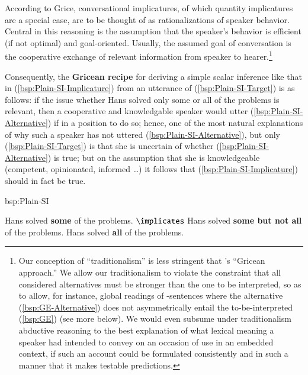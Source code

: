 \documentclass[fleqn,reqno,10pt]{article}
\renewcommand{\es}{\acro{es}}
\renewcommand{\mymark}[1]{\textbf{#1}}
\begin{document}
According to Grice, conversational implicatures, of which quantity
implicatures are a special case, are to be thought of as
rationalizations of speaker behavior. Central in this reasoning is the
assumption that the speaker's behavior is efficient (if not optimal)
and goal-oriented. Usually, the assumed goal of conversation is the
cooperative exchange of relevant information from speaker to
hearer.\footnote{Our conception of ``traditionalism'' is less
  stringent that \citeauthor{ChemlaSingh2014:Remarks-on-the-}'s
  ``Gricean approach.'' We allow our traditionalism to violate the
  constraint that all considered alternatives must be stronger than
  the one to be interpreted, so as to allow, for instance, global
  readings of \es-sentences where the alternative
  (\ref{bsp:GE-Alternative}) does not asymmetrically entail the
  to-be-interpreted (\ref{bsp:GE}) (see more below). We would even
  subsume under traditionalism abductive reasoning to the best
  explanation of what lexical meaning a speaker had intended to convey
  on an occasion of use in an embedded context, if such an account
  could be formulated consistently and in such a manner that it makes
  testable predictions.}

Consequently, the \mymark{Gricean recipe}
\citep[see][]{Geurts2010:Quantity-Implic} for deriving a simple scalar
inference like that in (\ref{bsp:Plain-SI-Implicature}) from an
utterance of (\ref{bsp:Plain-SI-Target}) is as follows: if the issue
whether Hans solved only some or all of the problems is relevant, then
a cooperative and knowledgable speaker would utter
(\ref{bsp:Plain-SI-Alternative}) if in a position to do so; hence, one
of the most natural explanations of why such a speaker has not uttered
(\ref{bsp:Plain-SI-Alternative}), but only (\ref{bsp:Plain-SI-Target})
is that she is uncertain of whether (\ref{bsp:Plain-SI-Alternative})
is true; but on the assumption that she is knowledgeable (competent,
opinionated, informed \dots) it follows that
(\ref{bsp:Plain-SI-Implicature}) should in fact be true.

\begin{exer}{bsp:Plain-SI}
  \ex 
    \begin{xlist}
      \ex \label{bsp:Plain-SI-Target} Hans solved \mymark{some} of the problems.
      \ex \label{bsp:Plain-SI-Implicature} $\implicates$ Hans solved
        \mymark{some but not all} of the problems.
      \ex  \label{bsp:Plain-SI-Alternative}  Hans solved \mymark{all} of the problems.
    \end{xlist}
\end{exer}
\end{document}
